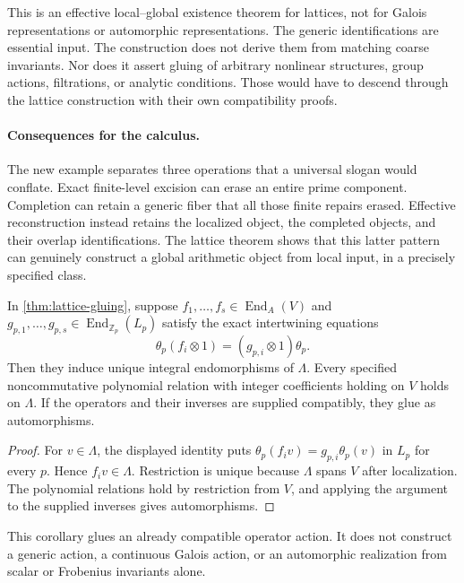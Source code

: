 This is an effective local--global existence theorem for lattices, not for Galois representations or automorphic representations. The generic identifications are essential input. The construction does not derive them from matching coarse invariants. Nor does it assert gluing of arbitrary nonlinear structures, group actions, filtrations, or analytic conditions. Those would have to descend through the lattice construction with their own compatibility proofs.

\paragraph{Consequences for the calculus.}
The new example separates three operations that a universal slogan would conflate. Exact finite-level excision can erase an entire prime component. Completion can retain a generic fiber that all those finite repairs erased. Effective reconstruction instead retains the localized object, the completed objects, and their overlap identifications. The lattice theorem shows that this latter pattern can genuinely construct a global arithmetic object from local input, in a precisely specified class.

\begin{corollary}\label{cor:lattice-operators}
In \cref{thm:lattice-gluing}, suppose $f_1,\ldots,f_s\in\operatorname{End}_A(V)$ and $g_{p,1},\ldots,g_{p,s}\in\operatorname{End}_{\mathbb Z_p}(L_p)$ satisfy the exact intertwining equations
\[
 \theta_p(f_i\otimes1)=(g_{p,i}\otimes1)\theta_p.
\]
Then they induce unique integral endomorphisms of $\Lambda$. Every specified noncommutative polynomial relation with integer coefficients holding on $V$ holds on $\Lambda$. If the operators and their inverses are supplied compatibly, they glue as automorphisms.
\end{corollary}
\begin{proof}
For $v\in\Lambda$, the displayed identity puts $\theta_p(f_i v)=g_{p,i}\theta_p(v)$ in $L_p$ for every $p$. Hence $f_i v\in\Lambda$. Restriction is unique because $\Lambda$ spans $V$ after localization. The polynomial relations hold by restriction from $V$, and applying the argument to the supplied inverses gives automorphisms.
\end{proof}

This corollary glues an already compatible operator action. It does not construct a generic action, a continuous Galois action, or an automorphic realization from scalar or Frobenius invariants alone.
